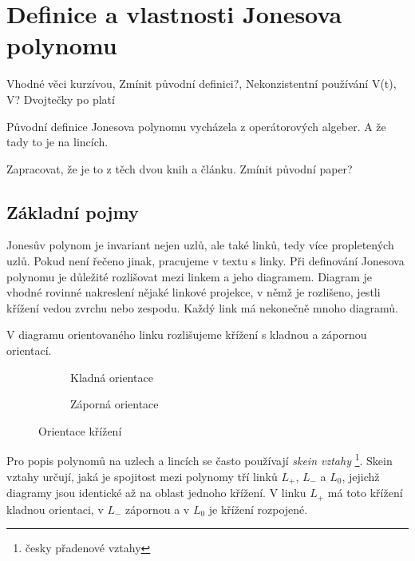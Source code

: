 
\chapter{Definice a vlastnosti Jonesova polynomu}

Vhodné věci kurzívou, Zmínit původní definici?, Nekonzistentní používání V(t), V? Dvojtečky po platí

Původní definice Jonesova polynomu vycházela z operátorových algeber. A že tady to je na lincích.

Zapracovat, že je to z těch dvou knih a článku. Zmínit původní paper?
\section{Základní pojmy}
Jonesův polynom je invariant nejen uzlů, ale také linků, tedy více propletených uzlů. Pokud není řečeno jinak, pracujeme v textu s linky. 
Při definování Jonesova polynomu je důležité rozlišovat mezi linkem a jeho diagramem. Diagram je vhodné rovinné nakreslení nějaké linkové projekce, v němž je rozlišeno, jestli křížení vedou zvrchu nebo zespodu. Každý link má nekonečně mnoho diagramů.

V diagramu orientovaného linku rozlišujeme křížení s kladnou a zápornou orientací.

\begin{figure}[h]  
\centering 
\begin{subfigure}[t]{0.4\linewidth}\centering
{} 
\caption{Kladná orientace} 
\end{subfigure}
\begin{subfigure}[t]{0.4\linewidth}\centering
{}  
\caption{Záporná orientace}
\end{subfigure}
\caption{Orientace křížení}
\end{figure}  


Pro popis polynomů na uzlech a lincích se často používají \emph{skein vztahy} \footnote{česky přadenové vztahy}.
Skein vztahy určují, jaká je spojitost mezi polynomy tří linků $L_+$, $ L_-$ a $L_0$, jejichž diagramy jsou identické až na oblast jednoho křížení. V linku $L_+$ má toto křížení kladnou orientaci, v $L_-$ zápornou a v $L_0$ je křížení rozpojené.

